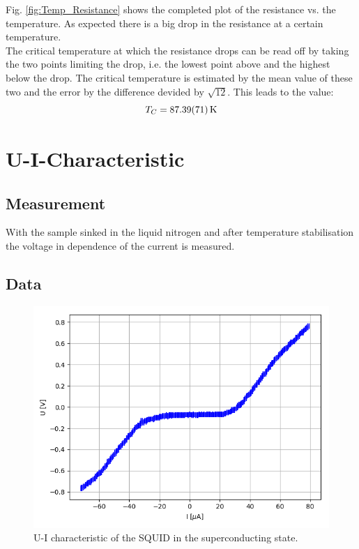 \documentclass[12pt,a4paper]{article}
\begin{document}
Fig. \ref{fig:Temp_Resistance} shows the completed plot of the resistance vs. the temperature. As expected there is a big drop in the resistance at a certain temperature. \\
The critical temperature at which the resistance drops can be read off by taking the two points limiting the drop, i.e. the lowest point above and the highest below the drop. The critical temperature is estimated by the mean value of these two and the error by the difference devided by $\sqrt{12}$. This leads to the value:
\begin{equation*}
T_C = \SI{87.39 \pm 0.71}{K}
\end{equation*}


\section{U-I-Characteristic}
\subsection{Measurement}
With the sample sinked in the liquid nitrogen and after temperature stabilisation the voltage in dependence of the current is measured.

\subsection{Data}

\begin{figure} [H]
\centering
\includegraphics[scale=0.8]{Bilder/U_I_characteristic/characteristic.PNG}
\caption{U-I characteristic of the SQUID in the superconducting state.}
\label{fig:U-I-characteristic}
\end{figure}
\end{document}
